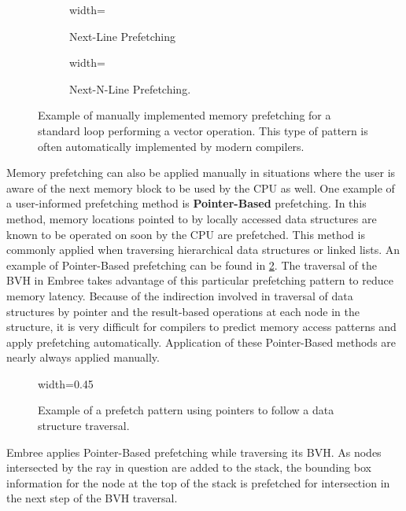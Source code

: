 \begin{figure}[H]
  \begin{subfigure}[t]{0.48\textwidth}
    \centering
    {width=\textwidth}
    \caption{Next-Line Prefetching}
    \vfill
  \end{subfigure}
  \hfill
  \begin{subfigure}[t]{0.48\textwidth}
    \centering
    {width=\textwidth}
    \caption{Next-N-Line Prefetching.}
  \end{subfigure}
  \caption[Compiler memory prefetching examples.]{Example of manually implemented
    memory prefetching for a standard loop performing a vector operation. This
    type of pattern is often automatically implemented by modern compilers.}
  \label{fig:prefetch_examples}
\end{figure}

Memory prefetching can also be applied manually in situations where the user is
aware of the next memory block to be used by the CPU as well. One example of a
user-informed prefetching method is \textbf{Pointer-Based} prefetching. In this method,
memory locations pointed to by locally accessed data structures are known to be
operated on soon by the CPU are prefetched. This method is commonly applied when
traversing hierarchical data structures or linked lists. An example of
Pointer-Based prefetching can be found in \ref{fig:pointer_prefetching}. The
traversal of the BVH in Embree takes advantage of this particular prefetching
pattern to reduce memory latency. Because of the indirection involved in
traversal of data structures by pointer and the result-based operations at each
node in the structure, it is very difficult for compilers to predict memory
access patterns and apply prefetching automatically. Application of these
Pointer-Based methods are nearly always applied manually.

\begin{figure}[H]
\centering
{width=0.45\textwidth}
\caption[Manual memory prefetching example.]{Example of a prefetch pattern using
  pointers to follow a data structure traversal.}
\label{fig:pointer_prefetching}
\end{figure}

Embree applies Pointer-Based prefetching while traversing its BVH. As nodes
intersected by the ray in question are added to the stack, the bounding box
information for the node at the top of the stack is prefetched for intersection
in the next step of the BVH traversal.

